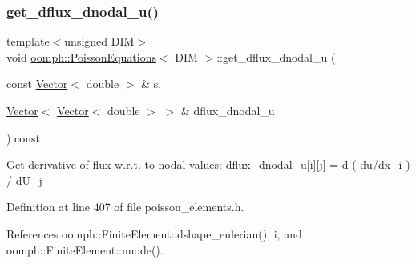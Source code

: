 \mbox{\label{classoomph_1_1PoissonEquations_a09faa6578f076ca5fb4b20aef5e2b4c6}} 
\subsubsection{\texorpdfstring{get\+\_\+dflux\+\_\+dnodal\+\_\+u()}{get\_dflux\_dnodal\_u()}}
{\footnotesize\ttfamily template$<$unsigned D\+IM$>$ \\
void \hyperlink{classoomph_1_1PoissonEquations}{oomph\+::\+Poisson\+Equations}$<$ D\+IM $>$\+::get\+\_\+dflux\+\_\+dnodal\+\_\+u (\begin{DoxyParamCaption}\item[{const \hyperlink{classoomph_1_1Vector}{Vector}$<$ double $>$ \&}]{s,  }\item[{\hyperlink{classoomph_1_1Vector}{Vector}$<$ \hyperlink{classoomph_1_1Vector}{Vector}$<$ double $>$ $>$ \&}]{dflux\+\_\+dnodal\+\_\+u }\end{DoxyParamCaption}) const\hspace{0.3cm}{\ttfamily [inline]}}

Get derivative of flux w.\+r.\+t. to nodal values\+: dflux\+\_\+dnodal\+\_\+u\mbox{[}i\mbox{]}\mbox{[}j\mbox{]} = d ( du/dx\+\_\+i ) / d\+U\+\_\+j 

Definition at line 407 of file poisson\+\_\+elements.\+h.



References oomph\+::\+Finite\+Element\+::dshape\+\_\+eulerian(), i, and oomph\+::\+Finite\+Element\+::nnode().

\mbox{\label{classoomph_1_1PoissonEquations_a566350ffaf9170d934ae02b0c3cb7064}} 
